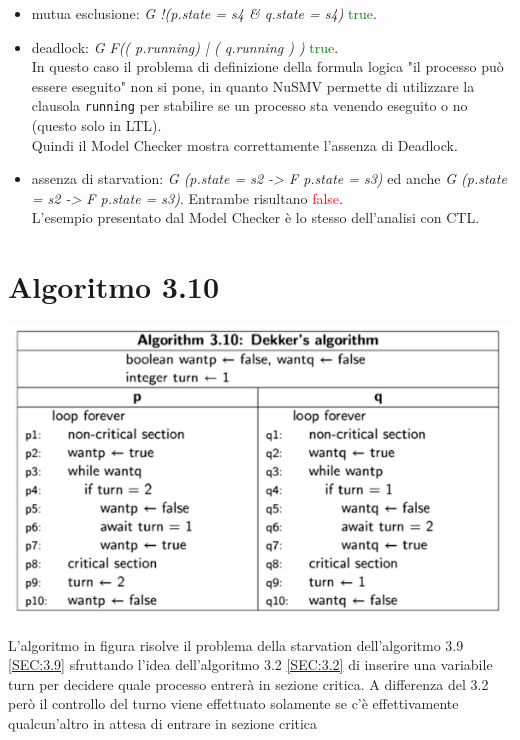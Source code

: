 \documentclass[a4paper]{article}
\begin{document}
\begin{itemize}
        \item mutua esclusione: \textit{G !(p.state = s4 \& q.state = s4)} \textcolor{green}{true}.\\
        \item deadlock: \textit{G F(( p.running) | ( q.running ) )} \textcolor{green}{true}. \\
		In questo caso il problema di definizione della formula logica "il processo può essere eseguito" non si pone, in quanto NuSMV permette di utilizzare la clausola \texttt{running} per stabilire se un processo sta venendo eseguito o no (questo solo in LTL).\\
		Quindi il Model Checker mostra correttamente l'assenza di Deadlock.
        \item assenza di starvation: \textit{G (p.state = s2 ->  F p.state = s3)} ed anche \textit{G (p.state = s2 ->  F p.state = s3)}. Entrambe risultano \textcolor{red}{false}.\\
		L'esempio presentato dal Model Checker è lo stesso dell'analisi con CTL.
\end{itemize}

\newpage
\section{Algoritmo 3.10}
\label{SEC:3.10}
\begin{center}\includegraphics[width=1\textwidth]{3.10.png}\end{center}
L'algoritmo in figura risolve il problema della starvation dell'algoritmo 3.9 \ref{SEC:3.9} sfruttando l'idea dell'algoritmo 3.2 \ref{SEC:3.2} di inserire una variabile turn per decidere quale processo entrerà in sezione critica.
A differenza del 3.2 però il controllo del turno viene effettuato solamente se c'è effettivamente qualcun'altro in attesa di entrare in sezione critica
\end{document}
